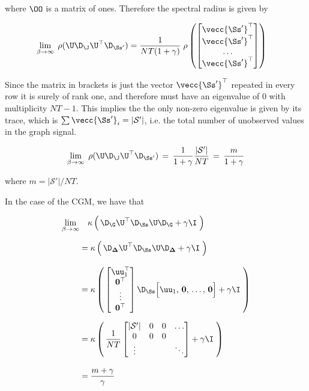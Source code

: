 where $ \OO$ is a matrix of ones. Therefore the spectral radius is given by 

\begin{align*}
    \lim_{\beta \rightarrow \infty} \; \rho(\U \D_\J \U^\top \D_{\Ss'}) &= \frac{1}{NT (1 + \gamma) } \; \rho \left( \begin{bmatrix}
        \vecc{\Ss'}^\top \\ \vecc{\Ss'}^\top \\ \dots \\ \vecc{\Ss'}^\top
    \end{bmatrix} \right)
\end{align*}

Since the matrix in brackets is just the vector $\vecc{\Ss'}^\top$ repeated in every row it is surely of rank one, and therefore must have an eigenvalue of 0 with multiplicity $NT - 1$. This implies the the only non-zero eigenvalue is given by its trace, which is $\sum \vecc{\Ss'}_i = |\mathcal{S}'|$, i.e. the total number of unobserved values in the graph signal. 

\begin{equation}
    \label{eq:beta_lim_inf}
    \lim_{\beta \rightarrow \infty} \; \rho(\U \D_\J \U^\top \D_{\Ss'}) \, = \, \frac{1}{1 + \gamma} \frac{|\mathcal{S}'|}{NT} \, = \, \frac{m}{1 + \gamma}
\end{equation}

where $m=|\mathcal{S}'|/NT$.

In the case of the CGM, we have that

\begin{align}
    \lim_{\beta \rightarrow \infty} & \quad \kappa \left(  \, \D_\G \U^\top \D_{\Ss} \U \D_\G + \gamma \I \; \right)  \notag \\[0.2cm]
    &= \kappa  \left(  \, \D_{\mathbf{\Delta}} \U^\top \D_{\Ss} \U \D_{\mathbf{\Delta}}  + \gamma \I \; \right) \notag \\[0.3cm]
    &= \kappa  \left(  \, 
    \begin{bmatrix} 
        \uu_1^\top \\ 
        \mathbf{0}^\top \\
        \vdots \\ 
        \mathbf{0}^\top 
    \end{bmatrix} \D_{\Ss}  \Big[ \uu_1, \, \mathbf{0}, \, \dots, \,\mathbf{0} \Big]
    + \gamma \I \; \right) \notag \\[0.2cm]
    &= \kappa  \left(  \, \frac{1}{NT}  \begin{bmatrix}
        |\mathcal{S}'| & 0 & 0 & \dots \\
        0 & 0 & 0 &  \\
        \vdots & & & \ddots
    \end{bmatrix}   + \gamma \I \; \right) \notag \\[0.3cm]
    &= \frac{m + \gamma}{\gamma}
\end{align}

